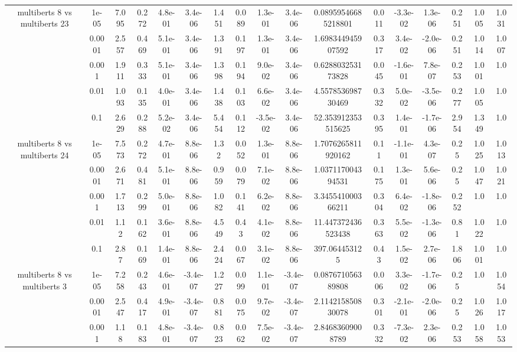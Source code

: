 \begin{tabular}{|c|c|c|c|c|c|c|c|c|c|c|c|c|c|c|c|c|}
\hline
\multirow{5}{*}{multiberts 8 vs multiberts 23} & 1e-05 & 7.095 & 0.272 & 4.8e-01 & 3.4e-06 & 1.451 & 0.089 & 1.3e-01 & 3.4e-06 & 0.08959546685218801 & 0.011 & -3.3e-02 & 1.3e-06 & 0.251 & 1.005 & 1.031 \\
 & 0.0001 & 2.557 & 0.469 & 5.1e-01 & 3.4e-06 & 1.391 & 0.197 & 1.3e-01 & 3.4e-06 & 1.698344945907592 & 0.317 & 3.4e-02 & -2.0e-06 & 0.251 & 1.014 & 1.007 \\
 & 0.001 & 1.911 & 0.333 & 5.1e-01 & 3.4e-06 & 1.398 & 0.194 & 9.0e-02 & 3.4e-06 & 0.628803253173828 & 0.045 & -1.6e-01 & 7.8e-07 & 0.253 & 1.001 & 1.0 \\
 & 0.01 & 1.093 & 0.135 & 4.0e-01 & 3.4e-06 & 1.438 & 0.103 & 6.6e-02 & 3.4e-06 & 4.557853698730469 & 0.332 & 5.0e-02 & -3.5e-06 & 0.277 & 1.005 & 1.0 \\
 & 0.1 & 2.629 & 0.288 & 5.2e-02 & 3.4e-06 & 5.454 & 0.112 & -3.5e-02 & 3.4e-06 & 52.353912353515625 & 0.395 & 1.4e-01 & -1.7e-06 & 2.954 & 1.349 & 1.0 \\
\hline
\multirow{5}{*}{multiberts 8 vs multiberts 24} & 1e-05 & 7.573 & 0.272 & 4.7e-01 & 8.8e-06 & 1.32 & 0.052 & 1.3e-01 & 8.8e-06 & 1.7076265811920162 & 0.11 & -1.1e-01 & 4.3e-07 & 0.25 & 1.025 & 1.013 \\
 & 0.0001 & 2.671 & 0.481 & 5.1e-01 & 8.8e-06 & 0.959 & 0.079 & 7.1e-02 & 8.8e-06 & 1.037117004394531 & 0.175 & 1.3e-01 & 5.6e-06 & 0.25 & 1.047 & 1.021 \\
 & 0.001 & 1.713 & 0.299 & 5.0e-01 & 8.8e-06 & 1.082 & 0.141 & 6.2e-02 & 8.8e-06 & 3.345541000366211 & 0.304 & 6.4e-02 & -1.8e-06 & 0.252 & 1.0 & 1.0 \\
 & 0.01 & 1.12 & 0.162 & 3.6e-01 & 8.8e-06 & 4.549 & 0.43 & 4.1e-02 & 8.8e-06 & 11.447372436523438 & 0.363 & 5.5e-02 & -1.3e-06 & 0.81 & 1.022 & 1.0 \\
 & 0.1 & 2.87 & 0.169 & 1.4e-01 & 8.8e-06 & 2.424 & 0.067 & 3.1e-02 & 8.8e-06 & 397.064453125 & 0.43 & 1.5e-02 & 2.7e-06 & 1.806 & 1.001 & 1.0 \\
\hline
\multirow{5}{*}{multiberts 8 vs multiberts 3} & 1e-05 & 7.258 & 0.243 & 4.6e-01 & -3.4e-07 & 1.227 & 0.099 & 1.1e-01 & -3.4e-07 & 0.087671056389808 & 0.006 & 3.3e-02 & -1.7e-06 & 0.25 & 1.0 & 1.054 \\
 & 0.0001 & 2.547 & 0.417 & 4.9e-01 & -3.4e-07 & 0.881 & 0.075 & 9.7e-02 & -3.4e-07 & 2.114215850830078 & 0.301 & -2.1e-01 & -2.0e-06 & 0.25 & 1.026 & 1.017 \\
 & 0.001 & 1.18 & 0.183 & 4.8e-01 & -3.4e-07 & 0.823 & 0.062 & 7.5e-02 & -3.4e-07 & 2.84683609008789 & 0.332 & -7.3e-02 & 2.3e-06 & 0.253 & 1.058 & 1.053 \\

\end{tabular}
